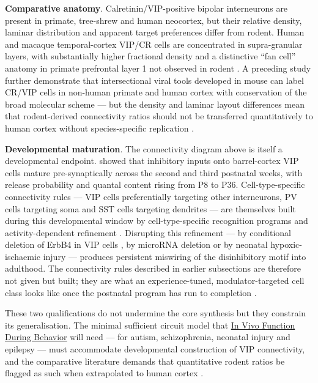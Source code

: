 \documentclass[11pt]{article}
\begin{document}
\textbf{Comparative anatomy}. Calretinin/VIP-positive bipolar interneurons are present in primate, tree-shrew and human neocortex, but their relative density, laminar distribution and apparent target preferences differ from rodent. Human and macaque temporal-cortex VIP/CR cells are concentrated in supra-granular layers, with substantially higher fractional density and a distinctive ``fan cell'' anatomy in primate prefrontal layer 1 not observed in rodent \citep{Defelipe1999, Vormsteinschneider2020}. A preceding study further demonstrate that intersectional viral tools developed in mouse can label CR/VIP cells in non-human primate and human cortex with conservation of the broad molecular scheme --- but the density and laminar layout differences mean that rodent-derived connectivity ratios should not be transferred quantitatively to human cortex without species-specific replication \citep{Defelipe1999}.

\textbf{Developmental maturation}. The connectivity diagram above is itself a developmental endpoint. \citet{Simacek2025a} showed that inhibitory inputs onto barrel-cortex VIP cells mature pre-synaptically across the second and third postnatal weeks, with release probability and quantal content rising from P8 to P36. Cell-type-specific connectivity rules --- VIP cells preferentially targeting other interneurons, PV cells targeting soma and SST cells targeting dendrites --- are themselves built during this developmental window by cell-type-specific recognition programs and activity-dependent refinement \citep{Favuzzi2019, Batistabrito2017, Qiu2020, Simacek2025a}. Disrupting this refinement --- by conditional deletion of ErbB4 in VIP cells \citep{Batistabrito2017}, by microRNA deletion or by neonatal hypoxic-ischaemic injury --- produces persistent miswiring of the disinhibitory motif into adulthood. The connectivity rules described in earlier subsections are therefore not given but built; they are what an experience-tuned, modulator-targeted cell class looks like once the postnatal program has run to completion \citep{Favuzzi2019, Batistabrito2017, Qiu2020, Simacek2025a, Abbah2022}.

These two qualifications do not undermine the core synthesis but they constrain its generalisation. The minimal sufficient circuit model that \href{/in-vivo-behavior}{In Vivo Function During Behavior} will need --- for autism, schizophrenia, neonatal injury and epilepsy --- must accommodate developmental construction of VIP connectivity, and the comparative literature demands that quantitative rodent ratios be flagged as such when extrapolated to human cortex \citep{Vormsteinschneider2020, Batistabrito2017, Qiu2020, Simacek2025a, Favuzzi2019}.
\end{document}
